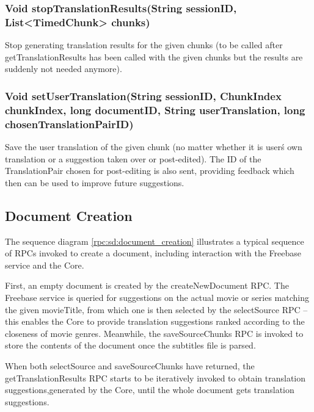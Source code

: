 \subsubsection{Void stopTranslationResults(String sessionID, List<TimedChunk> chunks)}
Stop generating translation results for the given chunks
(to be called after getTranslationResults has been called
with the given chunks but the results are suddenly not needed anymore).

\subsubsection{Void setUserTranslation(String sessionID, ChunkIndex chunkIndex, long documentID, String userTranslation, long chosenTranslationPairID)}
Save the user translation of the given chunk (no matter whether it is user\'s own translation or a suggestion taken over or post-edited).
The ID of the TranslationPair chosen for post-editing is also sent, providing feedback which then can be used to improve future suggestions.

\subsection{Document Creation}

The sequence diagram \ref{rpc:sd:document_creation} illustrates a typical sequence of RPCs invoked to create a document, including interaction with the Freebase service and the Core.

First, an empty document is created by the createNewDocument RPC. The Freebase service is queried for suggestions on the actual movie or series matching the given movieTitle, from which one is then selected by the selectSource RPC -- this enables the Core to provide translation suggestions ranked according to the closeness of movie genres. Meanwhile, the saveSourceChunks RPC is invoked to store the contents of the document once the subtitles file is parsed.

When both selectSource and saveSourceChunks have returned, the getTranslationResults RPC starts to be iteratively invoked to obtain translation suggestions,generated by the Core, until the whole document gets translation suggestions.

